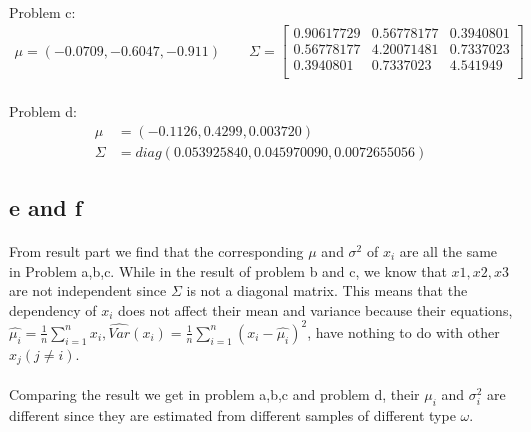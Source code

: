 \documentclass[]{article}
\begin{document}
            \paragraph{}Problem c:
                \begin{align*}
                \mu = (-0.0709, -0.6047, -0.911)
                \quad\quad
                \Sigma = \begin{bmatrix}
              0.90617729 & 0.56778177 & 0.3940801 \\
              0.56778177 & 4.20071481 & 0.7337023 \\
              0.3940801  & 0.7337023  & 4.541949  \\
                \end{bmatrix}
                \end{align*}
             \paragraph{}Problem d:
                 \begin{align*}
\mu &= (-0.1126, 0.4299, 0.003720)\\
\Sigma&= diag(0.053925840, 0.045970090, 0.0072655056)
                 \end{align*}
        \subsection{e and f}
            \paragraph{}From result part we find that the corresponding $\mu$ and $\sigma^2$ of $x_i$ are all the same in Problem a,b,c. While in the result of problem b and c, we know that $x1,x2,x3$ are not independent since $\Sigma$ is not a diagonal matrix. This means that the dependency of $x_i$ does not affect their mean and variance because their equations, $\hat{\mu_i} = \frac{1}{n}\sum_{i=1}^n x_i, \hat{Var}(x_i) = \frac{1}{n}\sum_{i=1}^n (x_i-\hat{\mu_i})^2$, have nothing to do with other $x_j(j \neq i)$.
            \paragraph{}Comparing the result we get in problem a,b,c and problem d, their $\mu_i$ and $\sigma_i^2$ are different since they are estimated from different samples of different type $\omega$.
\end{document}
